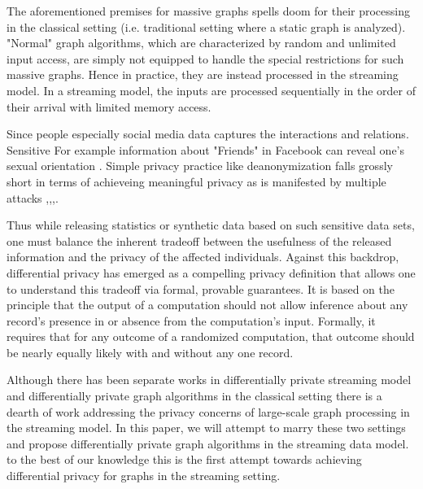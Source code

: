 \documentclass{article}
\theoremstyle{definition}
\begin{document}
 The aforementioned premises for massive graphs spells doom for their processing in the classical setting (i.e. traditional setting where a static graph is analyzed). "Normal" graph algorithms, which are characterized by random  and unlimited input access, are simply not equipped to handle the special restrictions for such massive graphs. Hence in practice, they are instead processed in the streaming model. In a streaming model, the inputs are  processed sequentially in the order of their arrival with limited memory access.   
 \par Since people especially social media data captures the interactions and relations. Sensitive For example information about "Friends" in Facebook can reveal one's sexual orientation \cite{}. Simple privacy practice like deanonymization falls grossly short in terms of achieveing meaningful privacy  as is  manifested by multiple attacks \cite{1},\cite{2},\cite{3},\cite{4}. 
 
Thus while releasing statistics or synthetic data based on such sensitive data sets, one
must balance the inherent tradeoff between the usefulness of the released information and the privacy
of the affected individuals. Against this backdrop, differential privacy has emerged as a
compelling privacy definition that allows one to understand this tradeoff via formal, provable guarantees. It is based on the principle that the output
of a computation should not allow inference about any
record’s presence in or absence from the computation’s input.
Formally, it requires that for any outcome of a randomized
computation, that outcome should be nearly equally
likely with and without any one record. 
\par Although there has been separate works in differentially private streaming model  and differentially private graph algorithms in the classical setting  there is a dearth of work addressing the privacy concerns of large-scale graph processing in the streaming model. In this paper, we will attempt to marry these two settings and propose differentially private graph algorithms in the streaming data model. to the best of our knowledge this is the first attempt towards achieving differential privacy for graphs in the streaming setting.
\end{document}
